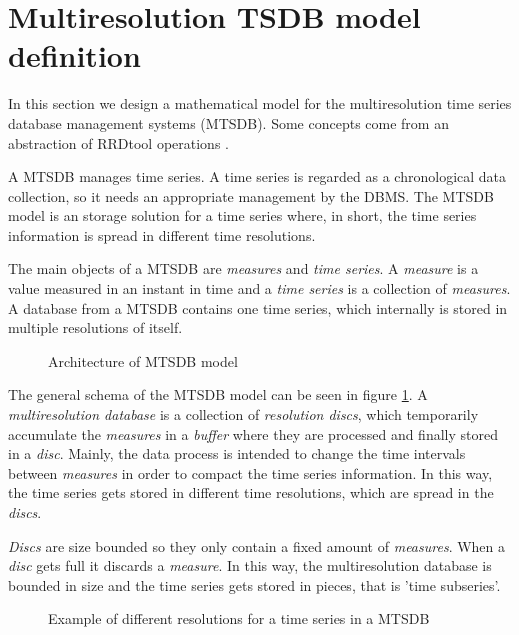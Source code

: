 \section{Multiresolution TSDB model definition}

In this section we design a mathematical model for the multiresolution time series database management systems (MTSDB). Some concepts come from an abstraction of RRDtool operations \parencite{rrdtool}. 

A MTSDB manages time series. A time series is regarded as a chronological data collection, so it needs an appropriate management by the DBMS.
The MTSDB model is an storage solution for a time series where, in short,  the time series information is spread in different time resolutions. 

The main objects of a MTSDB are \emph{measures} and \emph{time series}. A \emph{measure} is a value measured in an instant in time and a  \emph{time series} is a collection of \emph{measures}. A database from a MTSDB contains one time series, which internally is stored in multiple resolutions of itself.

\begin{figure}[tp]
\centering
\setlength{\unitlength}{0.3mm}

\caption{Architecture of MTSDB model}
\label{fig:model:mtsdb}
\end{figure}

The general schema of the MTSDB model can be seen in figure \ref{fig:model:mtsdb}.  A \emph{multiresolution database} is a collection of \emph{resolution discs}, which temporarily accumulate the \emph{measures} in a \emph{buffer} where they are processed and finally stored in a \emph{disc}. Mainly, the data process is intended to change the time intervals between \emph{measures} in order to compact the time series information. In this way, the time series gets stored in different time resolutions, which are spread in the \emph{discs}.

\emph{Discs} are size bounded so they only contain a fixed amount of \emph{measures}. When a \emph{disc} gets full it discards a \emph{measure}. In this way, the multiresolution database is bounded in size and the time series gets stored in pieces, that is 'time subseries'.



\begin{figure}[tp]
\centering

\caption{Example of different resolutions for a time series in a MTSDB}
\label{fig:model:window}
\end{figure}

